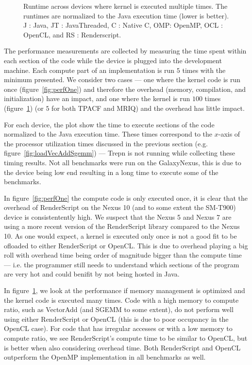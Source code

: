 \begin{figure}
  \caption{Runtime across devices where kernel is executed multiple times. The runtimes are normalized to the Java execution time (lower is better). J : Java, JT : JavaThreaded, C : Native C, OMP: OpenMP, OCL : OpenCL, and RS : Renderscript.}
  \label{fig:perfMany}
\end{figure}


The performance measurements are collected by measuring the time
  spent within each section of the code while the device is plugged
  into the development machine.
Each compute part of an implementation is run $5$ times with the minimum
  presented.
We consider two cases --- one where the kernel code is run once (figure~\ref{fig:perfOne}) and therefore
  the overhead (memory, compilation, and initialization) have an impact,
  and one where the kernel is run $100$ times (figure~\ref{fig:perfMany}) (or $5$ for both TPACF and MRIQ)
  and the overhead has little impact.

For each device, the plot show the time to execute sections of the code normalized
  to the Java execution time.
These times correspond to the $x$-axis of the processor utilization times discussed
  in the previous section (e.g. figure~\ref{fig:loadVecAddSgemm}) --- Trepn is not
  running while collecting these timing results.
Not all benchmarks were run on the GalaxyNexus, this is due to the device
  being low end resulting in a long time to execute some of the benchmarks.

In figure~\ref{fig:perfOne} the compute code is only executed once, it is clear that 
  the overhead of RenderScript on the Nexus 10 (and to some extent the SM-T900) device is consistentently high.
We suspect that the Nexus 5 and Nexus 7 are using a more recent version of the RenderScript library compared to the Nexus 10.
As one would expect, a kernel is executed only once is not a good fit to be ofloaded to either RenderScript or OpenCL.
This is due to overhead playing a big roll with overhead time being order of magnitude bigger than the compute time ---
  i.e. the programmer still needs to understand which sections of the program are very hot and could benifit by not being hosted 
  in Java.

In figure~\ref{fig:perfMany}, we look at the performance if memory management is optimized and the kernel code is executed 
  many times.
Code with a high memory to compute ratio, such as VectorAdd (and SGEMM to some extent), do not perform well using either
  RenderScript or OpenCL (this is due to poor occupancy in the OpenCL case).
For code that has irregular accesses or with a low memory to compute ratio, we see RenderScript's compute time to be similar
  to OpenCL, but is better when also considering overhead time.
Both RenderScript and OpenCL outperform the OpenMP implementation in all benchmarks as well.

